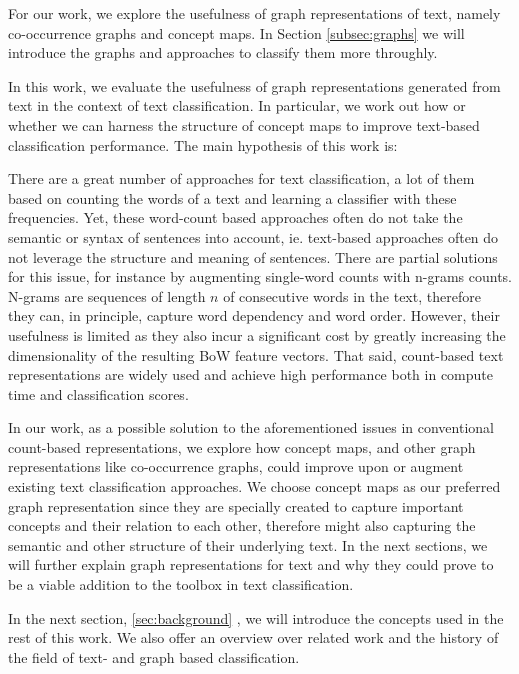 For our work, we explore the usefulness of graph representations of text, namely co-occurrence graphs and concept maps.
In Section \ref{subsec:graphs} we will introduce the graphs and approaches to classify them more throughly.

In this work, we evaluate the usefulness of graph representations generated from text in the context of text classification. In particular, we work out how or whether we can harness the structure of concept maps to improve text-based classification performance.
The main hypothesis of this work is:
\begin{quote}
\hypothesis
\end{quote}

There are a great number of approaches for text classification, a lot of them based on counting the words of a text and learning a classifier with these frequencies.
Yet, these word-count based approaches often do not take the semantic or syntax of sentences into account, ie. text-based approaches often do not leverage the structure and meaning of sentences.
There are partial solutions for this issue, for instance by augmenting single-word counts with n-grams \cite[p.~191]{Manning2000} counts.
N-grams are sequences of length $n$ of consecutive words in the text, therefore they can, in principle, capture word dependency and word order.
However, their usefulness is limited as they also incur a significant cost by greatly increasing the dimensionality of the resulting BoW feature vectors.
That said, count-based text representations are widely used and achieve high performance both in compute time and classification scores.

In our work, as a possible solution to the aforementioned issues in conventional count-based representations, we explore how concept maps, and other graph representations like co-occurrence graphs, could improve upon or augment existing text classification approaches.
We choose concept maps as our preferred graph representation since they are specially created to capture important concepts and their relation to each other, therefore might also capturing the semantic and other structure of their underlying text.
In the next sections, we will further explain graph representations for text and why they could prove to be a viable addition to the toolbox in text classification.

In the next section, \ref{sec:background} , we will introduce the concepts used in the rest of this work.
We also offer an overview over related work and the history of the field of text- and graph based classification.

